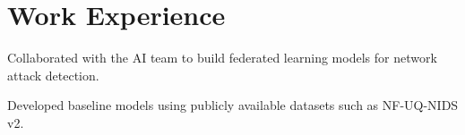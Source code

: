 \documentclass[]{resume-template}
\begin{document}
\begin{minipage}[t]{0.66\textwidth}

  \section{Work Experience}\label{sec:Work Experience}
  \label{subsec:protectionshield}
  \vspace{\topsep}
  \begin{tightemize}
  \item Collaborated with the AI team to build federated learning models for network attack detection.
  \item Developed baseline models using publicly available datasets such as NF-UQ-NIDS v2.
  \end{tightemize}


\end{minipage}
\end{document}
